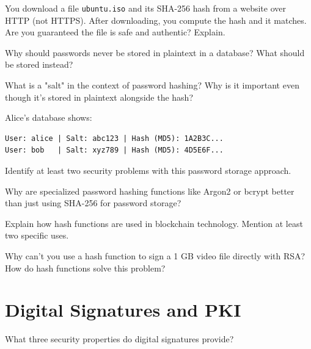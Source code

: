 \documentclass[11pt,a4paper]{report}
\begin{document}
\begin{ex}
You download a file \texttt{ubuntu.iso} and its SHA-256 hash from a website over HTTP (not HTTPS). After downloading, you compute the hash and it matches. Are you guaranteed the file is safe and authentic? Explain.
\end{ex}

\begin{ex}
Why should passwords never be stored in plaintext in a database? What should be stored instead?
\end{ex}

\begin{ex}
What is a "salt" in the context of password hashing? Why is it important even though it's stored in plaintext alongside the hash?
\end{ex}

\begin{ex}
Alice's database shows:
\begin{verbatim}
User: alice | Salt: abc123 | Hash (MD5): 1A2B3C...
User: bob   | Salt: xyz789 | Hash (MD5): 4D5E6F...
\end{verbatim}

Identify at least two security problems with this password storage approach.
\end{ex}

\begin{ex}
Why are specialized password hashing functions like Argon2 or bcrypt better than just using SHA-256 for password storage?
\end{ex}

\begin{ex}
Explain how hash functions are used in blockchain technology. Mention at least two specific uses.
\end{ex}

\begin{ex}
Why can't you use a hash function to sign a 1 GB video file directly with RSA? How do hash functions solve this problem?
\end{ex}

\section{Digital Signatures and PKI}

\begin{ex}
What three security properties do digital signatures provide?
\end{ex}
\end{document}
